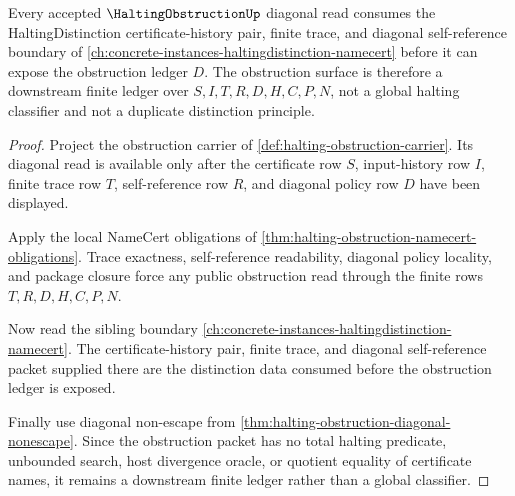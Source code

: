 \begin{theorem}
\label{thm:halting-obstruction-distinction-boundary}
Every accepted $\HaltingObstructionUp$ diagonal read consumes the HaltingDistinction certificate-history pair, finite trace, and diagonal self-reference boundary of \autoref{ch:concrete-instances-haltingdistinction-namecert} before it can expose the obstruction ledger $D$. The obstruction surface is therefore a downstream finite ledger over $S,I,T,R,D,H,C,P,N$, not a global halting classifier and not a duplicate distinction principle.
\end{theorem}
\begin{proof}
Project the obstruction carrier of \autoref{def:halting-obstruction-carrier}. Its diagonal read is available only after the certificate row $S$, input-history row $I$, finite trace row $T$, self-reference row $R$, and diagonal policy row $D$ have been displayed.

Apply the local NameCert obligations of \autoref{thm:halting-obstruction-namecert-obligations}. Trace exactness, self-reference readability, diagonal policy locality, and package closure force any public obstruction read through the finite rows $T,R,D,H,C,P,N$.

Now read the sibling boundary \autoref{ch:concrete-instances-haltingdistinction-namecert}. The certificate-history pair, finite trace, and diagonal self-reference packet supplied there are the distinction data consumed before the obstruction ledger is exposed.

Finally use diagonal non-escape from \autoref{thm:halting-obstruction-diagonal-nonescape}. Since the obstruction packet has no total halting predicate, unbounded search, host divergence oracle, or quotient equality of certificate names, it remains a downstream finite ledger rather than a global classifier.
\end{proof}

